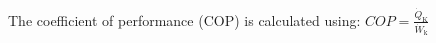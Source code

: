 The coefficient of performance (COP) is calculated using:  
\( COP = \frac{\dot{Q}_\text{K}}{\dot{W}_\text{k}} \)